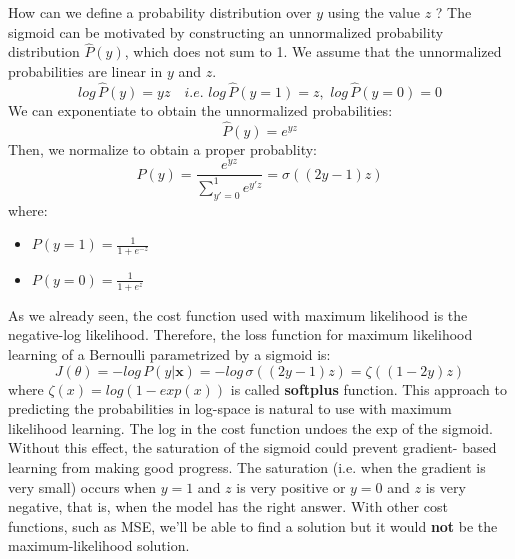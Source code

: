\begin{itemize}
\begin{itemize}
    \end{itemize}
    How can we define a probability distribution over $y$ using the value $z$ ? The sigmoid can be motivated by constructing an unnormalized probability distribution $\hat{P}(y)$, which does not sum to 1. We assume that the unnormalized probabilities are linear in $y$ and $z$.
    \[log\, \hat{P}(y) = yz \quad i.e. \,\, log\, \hat{P}(y = 1) = z, \,\, log\, \hat{P}(y = 0) = 0\]
    We can exponentiate to obtain the unnormalized probabilities:
    \[\hat{P}(y) = e^{yz}\]
    Then, we normalize to obtain a proper probablity:
    \[P(y) = \frac{e^{yz}}{\sum_{y'=0}^{1} e^{y'z}} = \sigma((2y - 1)z)\]
    where:
    \begin{itemize}
        \item $P(y = 1) = \frac{1}{1 + e^{-z}}$
        \item $P(y = 0) = \frac{1}{1 + e^{z}}$
    \end{itemize}
    As we already seen, the cost function used with maximum likelihood is the negative-log likelihood. Therefore, the loss function for maximum likelihood learning of a Bernoulli parametrized by a sigmoid is:
    \[J(\theta) = -log\, P(y|\textbf{x}) = -log\,\sigma((2y - 1)z) = \zeta((1 - 2y)z)\]
    where $\zeta(x) = log(1 - exp(x))$ is called \textbf{softplus} function.\newline\newline
    This approach to predicting the probabilities in log-space is natural to use with maximum likelihood learning. The log in the cost function undoes the exp of the sigmoid. Without this effect, the saturation of the sigmoid could prevent gradient- based learning from making good progress.\newline\newline
    The saturation (i.e. when the gradient is very small) occurs when $y = 1$ and $z$ is very positive or $y = 0$ and $z$ is very negative, that is, when the model has the right answer.\newline\newline
    With other cost functions, such as MSE, we'll be able to find a solution but it would \textbf{not} be the maximum-likelihood solution.


\end{itemize}
